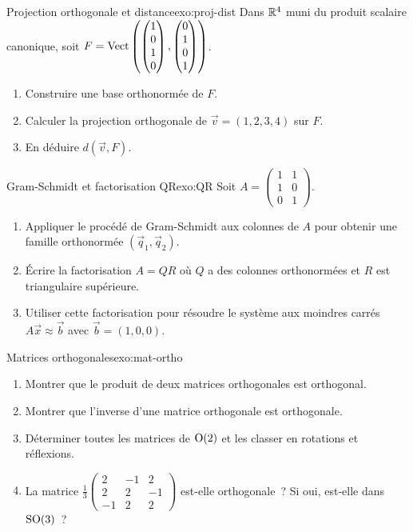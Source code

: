 \begin{exercise}{\intermediate{} Projection orthogonale et distance}{exo:proj-dist}
  Dans ${\mathbb{R}}^4$ muni du produit scalaire canonique, soit
  $F=\operatorname{Vect}\left(\begin{pmatrix}1\\0\\1\\0\end{pmatrix},
  \begin{pmatrix}0\\1\\0\\1\end{pmatrix}\right)$.
  \begin{enumerate}[label=(\alph*)]
    \item Construire une base orthonormée de $F$.
    \item Calculer la projection orthogonale de
      $\vec{v}=(1,2,3,4)$ sur $F$.
    \item En déduire $d(\vec{v},F)$.
  \end{enumerate}
\end{exercise}

\begin{exercise}{\intermediate{} Gram-Schmidt et factorisation QR}{exo:QR}
  Soit $A=\begin{pmatrix}1&1\\1&0\\0&1\end{pmatrix}$.
  \begin{enumerate}[label=(\alph*)]
    \item Appliquer le procédé de Gram-Schmidt aux colonnes de $A$ pour
      obtenir une famille orthonormée $(\vec{q}_1,\vec{q}_2)$.
    \item Écrire la factorisation $A=QR$ où $Q$ a des colonnes
      orthonormées et $R$ est triangulaire supérieure.
    \item Utiliser cette factorisation pour résoudre le système aux
      moindres carrés $A\vec{x}\approx\vec{b}$ avec
      $\vec{b}=(1,0,0)$.
  \end{enumerate}
\end{exercise}

\begin{exercise}{\intermediate{} Matrices orthogonales}{exo:mat-ortho}
  \begin{enumerate}[label=(\alph*)]
    \item Montrer que le produit de deux matrices orthogonales est
      orthogonal.
    \item Montrer que l'inverse d'une matrice orthogonale est orthogonale.
    \item Déterminer toutes les matrices de $\operatorname{O}(2)$ et les classer
      en rotations et réflexions.
    \item La matrice
      $\frac{1}{3}\begin{pmatrix}2&-1&2\\2&2&-1\\-1&2&2\end{pmatrix}$
      est-elle orthogonale~? Si oui, est-elle dans $\operatorname{SO}(3)$~?
  \end{enumerate}
\end{exercise}

